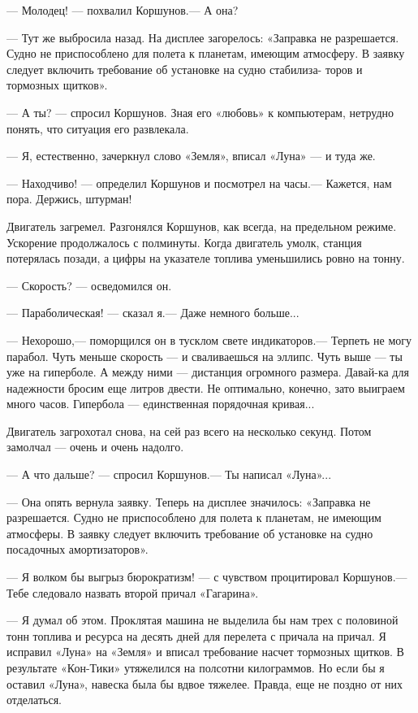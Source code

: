 \documentclass[11pt,a4paper,oneside]{article}
\begin{document}
— Молодец! — похвалил Коршунов.— А она?

— Тут же выбросила назад. На дисплее загорелось: «Заправка не разрешается. Судно не приспособлено для полета к планетам, имеющим атмосферу. В заявку следует включить требование об установке на судно стабилиза- торов и тормозных щитков».

— А ты? — спросил Коршунов. Зная его «любовь» к компьютерам, нетрудно понять, что ситуация его развлекала.

— Я, естественно, зачеркнул слово «Земля», вписал «Луна» — и туда же.

— Находчиво! — определил Коршунов и посмотрел на часы.— Кажется, нам пора. Держись, штурман!

Двигатель загремел. Разгонялся Коршунов, как всегда, на предельном режиме. Ускорение продолжалось с полминуты. Когда двигатель умолк, станция потерялась позади, а цифры на указателе топлива уменьшились ровно на тонну.

— Скорость? — осведомился он.

— Параболическая! — сказал	я.— Даже немного больше...

— Нехорошо,— поморщился он в тусклом свете индикаторов.— Терпеть не могу парабол. Чуть меньше скорость — и сваливаешься на эллипс. Чуть выше — ты уже на гиперболе. А между ними — дистанция огромного размера. Давай-ка для надежности бросим еще литров двести. Не оптимально, конечно, зато выиграем много часов. Гипербола — единственная порядочная кривая...

Двигатель загрохотал снова, на сей раз всего на несколько секунд. Потом замолчал — очень и очень надолго.

— А что дальше? — спросил Коршунов.— Ты написал «Луна»...

— Она опять вернула заявку. Теперь на дисплее значилось: «Заправка не разрешается. Судно не приспособлено для полета к планетам, не имеющим атмосферы. В заявку следует включить требование об установке на судно посадочных амортизаторов».

— Я волком бы выгрыз бюрократизм! — с чувством процитировал Коршунов.— Тебе следовало назвать второй причал «Гагарина».

— Я думал об этом. Проклятая машина не выделила бы нам трех с половиной тонн топлива и ресурса на десять дней для перелета с причала на причал. Я исправил «Луна» на «Земля» и вписал требование насчет тормозных щитков. В результате «Кон-Тики» утяжелился на полсотни килограммов. Но если бы я оставил «Луна», навеска была бы вдвое тяжелее. Правда, еще не поздно от них отделаться.
\end{document}
